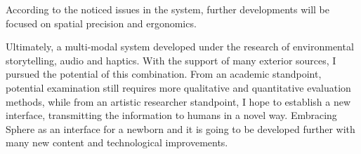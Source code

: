         According to the noticed issues in the system, further developments will be focused on spatial precision and ergonomics.\par

        Ultimately, a multi-modal system developed under the research of environmental storytelling, audio and haptics. With the support of many exterior sources, I pursued the potential of this combination. From an academic standpoint, potential examination still requires more qualitative and quantitative evaluation methods, while from an artistic researcher standpoint, I hope to establish a new interface, transmitting the information to humans in a novel way. Embracing Sphere as an interface for a newborn and it is going to be developed further with many new content and technological improvements.\par
